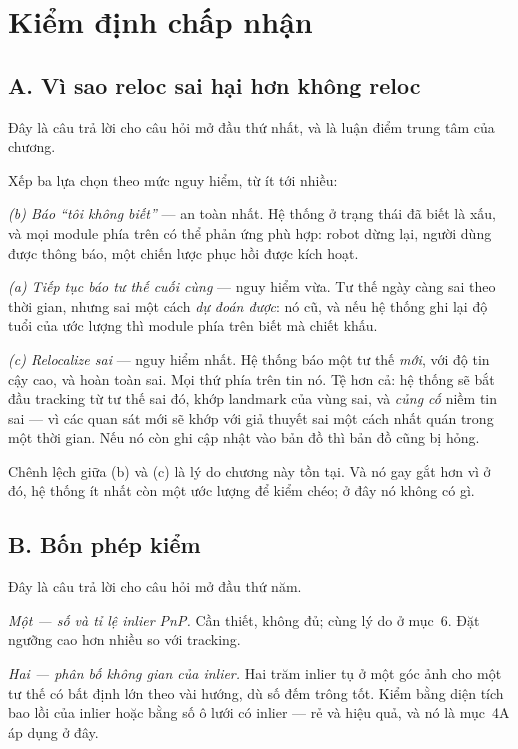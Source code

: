 \documentclass[../../vslam.tex]{subfiles}
\begin{document}
\section{Kiểm định chấp nhận}

\subsection{A. Vì sao reloc sai hại hơn không reloc}

Đây là câu trả lời cho câu hỏi mở đầu thứ nhất, và là luận điểm trung tâm của chương.

Xếp ba lựa chọn theo mức nguy hiểm, từ ít tới nhiều:

\emph{(b) Báo ``tôi không biết''} --- an toàn nhất. Hệ thống ở trạng thái đã biết là xấu, và mọi module phía trên có thể phản ứng phù hợp: robot dừng lại, người dùng được thông báo, một chiến lược phục hồi được kích hoạt.

\emph{(a) Tiếp tục báo tư thế cuối cùng} --- nguy hiểm vừa. Tư thế ngày càng sai theo thời gian, nhưng sai một cách \emph{dự đoán được}: nó cũ, và nếu hệ thống ghi lại độ tuổi của ước lượng thì module phía trên biết mà chiết khấu.

\emph{(c) Relocalize sai} --- nguy hiểm nhất. Hệ thống báo một tư thế \emph{mới}, với độ tin cậy cao, và hoàn toàn sai. Mọi thứ phía trên tin nó. Tệ hơn cả: hệ thống sẽ bắt đầu tracking từ tư thế sai đó, khớp landmark của vùng sai, và \emph{củng cố} niềm tin sai --- vì các quan sát mới sẽ khớp với giả thuyết sai một cách nhất quán trong một thời gian. Nếu nó còn ghi cập nhật vào bản đồ thì bản đồ cũng bị hỏng.

Chênh lệch giữa (b) và (c) là lý do chương này tồn tại. Và nó gay gắt hơn  vì ở đó, hệ thống ít nhất còn một ước lượng để kiểm chéo; ở đây nó không có gì.

\subsection{B. Bốn phép kiểm}

Đây là câu trả lời cho câu hỏi mở đầu thứ năm.

\emph{Một --- số và tỉ lệ inlier PnP.} Cần thiết, không đủ; cùng lý do ở  mục~6. Đặt ngưỡng cao hơn nhiều so với tracking.

\emph{Hai --- phân bố không gian của inlier.} Hai trăm inlier tụ ở một góc ảnh cho một tư thế có bất định lớn theo vài hướng, dù số đếm trông tốt. Kiểm bằng diện tích bao lồi của inlier hoặc bằng số ô lưới có inlier --- rẻ và hiệu quả, và nó là  mục~4A áp dụng ở đây.
\end{document}
